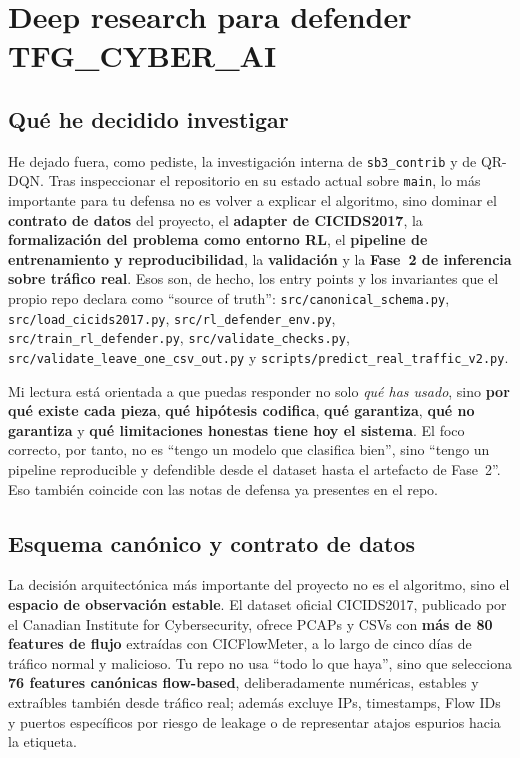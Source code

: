 ﻿\documentclass[12pt,a4paper]{article}
\begin{document}
\section{Deep research para defender TFG\_CYBER\_AI}

\subsection{Qué he decidido investigar}

He dejado fuera, como pediste, la investigación interna de \texttt{sb3\_contrib} y de QR-DQN. Tras
inspeccionar el repositorio en su estado actual sobre \texttt{main}, lo más importante para tu
defensa no es volver a explicar el algoritmo, sino dominar el \textbf{contrato de datos} del
proyecto, el \textbf{adapter de CICIDS2017}, la \textbf{formalización del problema como entorno RL},
el \textbf{pipeline de entrenamiento y reproducibilidad}, la \textbf{validación} y la \textbf{Fase~2
de inferencia sobre tráfico real}. Esos son, de hecho, los entry points y los invariantes que el
propio repo declara como ``source of truth'': \verb|src/canonical_schema.py|,
\verb|src/load_cicids2017.py|, \verb|src/rl_defender_env.py|, \verb|src/train_rl_defender.py|,
\verb|src/validate_checks.py|, \verb|src/validate_leave_one_csv_out.py| y
\verb|scripts/predict_real_traffic_v2.py|.

Mi lectura está orientada a que puedas responder no solo \textit{qué has usado}, sino
\textbf{por qué existe cada pieza}, \textbf{qué hipótesis codifica}, \textbf{qué garantiza},
\textbf{qué no garantiza} y \textbf{qué limitaciones honestas tiene hoy el sistema}. El foco
correcto, por tanto, no es ``tengo un modelo que clasifica bien'', sino ``tengo un pipeline
reproducible y defendible desde el dataset hasta el artefacto de Fase~2''. Eso también coincide con
las notas de defensa ya presentes en el repo.

\subsection{Esquema canónico y contrato de datos}

La decisión arquitectónica más importante del proyecto no es el algoritmo, sino el \textbf{espacio
de observación estable}. El dataset oficial CICIDS2017, publicado por el Canadian Institute for
Cybersecurity, ofrece PCAPs y CSVs con \textbf{más de 80 features de flujo} extraídas con
CICFlowMeter, a lo largo de cinco días de tráfico normal y malicioso. Tu repo no usa ``todo lo que
haya'', sino que selecciona \textbf{76 features canónicas flow-based}, deliberadamente numéricas,
estables y extraíbles también desde tráfico real; además excluye IPs, timestamps, Flow IDs y puertos
específicos por riesgo de leakage o de representar atajos espurios hacia la etiqueta.
\end{document}
